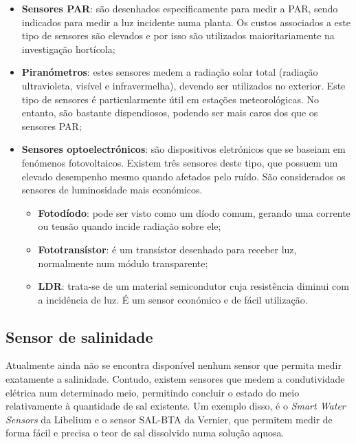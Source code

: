 \begin{itemize}
	\item \textbf{Sensores \ac{PAR}}: são desenhados especificamente para medir a \ac{PAR}, sendo indicados para medir a luz incidente numa planta. Os custos associados a este tipo de sensores são elevados e por isso são utilizados maioritariamente na investigação hortícola; 
	


	
	
	
	\item \textbf{Piranómetros}: estes sensores medem a radiação solar total (radiação ultravioleta, visível e infravermelha), devendo ser utilizados no exterior. Este tipo de sensores é particularmente útil em estações meteorológicas. No entanto, são bastante dispendiosos, podendo ser mais caros dos que os sensores \ac{PAR}; 
	
	
	
	
	\item \textbf{Sensores optoelectrónicos}: são dispositivos eletrónicos que se baseiam em fenómenos fotovoltaicos. Existem três sensores deste tipo, que possuem um elevado desempenho mesmo quando afetados pelo ruído. São considerados os sensores de luminosidade mais económicos.  
	 
		\begin{itemize}
			\item \textbf{Fotodíodo}: pode ser visto como um díodo comum, gerando uma corrente ou tensão quando incide radiação sobre ele; 
			\item \textbf{Fototransístor}: é um transístor desenhado para receber luz, normalmente num módulo transparente; 
			\item \textbf{\ac{LDR}}: trata-se de um material semicondutor cuja resistência diminui com a incidência de luz. É um sensor económico e de fácil utilização. 
		\end{itemize}
	
\end{itemize}





\subsection{Sensor de salinidade}


Atualmente ainda não se encontra disponível nenhum sensor que permita medir exatamente a salinidade. Contudo, existem sensores que medem a condutividade elétrica num determinado meio, permitindo concluir o estado do meio relativamente à quantidade de sal existente. 
Um exemplo disso, é o \textit{Smart Water Sensors} da Libelium\cite{World2014}  e o sensor SAL-BTA da Vernier\cite{sall}, que permitem medir de forma fácil e precisa o teor de sal dissolvido numa solução aquosa.




